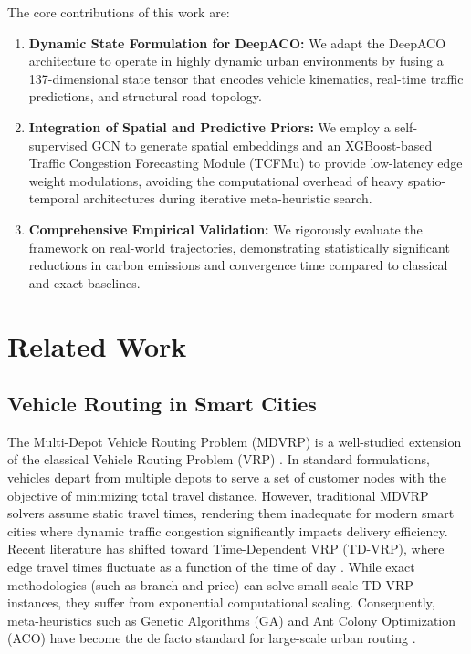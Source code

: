 \documentclass[conference]{IEEEtran}
\begin{document}
The core contributions of this work are:
\begin{enumerate}
    \item \textbf{Dynamic State Formulation for DeepACO:} We adapt the DeepACO architecture to operate in highly dynamic urban environments by fusing a 137-dimensional state tensor that encodes vehicle kinematics, real-time traffic predictions, and structural road topology.
    \item \textbf{Integration of Spatial and Predictive Priors:} We employ a self-supervised GCN to generate spatial embeddings and an XGBoost-based Traffic Congestion Forecasting Module (TCFMu) to provide low-latency edge weight modulations, avoiding the computational overhead of heavy spatio-temporal architectures \cite{stgcn_traffic} during iterative meta-heuristic search.
    \item \textbf{Comprehensive Empirical Validation:} We rigorously evaluate the framework on real-world trajectories, demonstrating statistically significant reductions in carbon emissions and convergence time compared to classical and exact baselines.
\end{enumerate}

\section{Related Work}
\label{sec:related_work}

\subsection{Vehicle Routing in Smart Cities}
The Multi-Depot Vehicle Routing Problem (MDVRP) is a well-studied extension of the classical Vehicle Routing Problem (VRP) \cite{vrp_survey}. In standard formulations, vehicles depart from multiple depots to serve a set of customer nodes with the objective of minimizing total travel distance. However, traditional MDVRP solvers assume static travel times, rendering them inadequate for modern smart cities where dynamic traffic congestion significantly impacts delivery efficiency. Recent literature has shifted toward Time-Dependent VRP (TD-VRP), where edge travel times fluctuate as a function of the time of day \cite{tdvrp_ref}. While exact methodologies (such as branch-and-price) can solve small-scale TD-VRP instances, they suffer from exponential computational scaling. Consequently, meta-heuristics such as Genetic Algorithms (GA) and Ant Colony Optimization (ACO) have become the de facto standard for large-scale urban routing \cite{metaheuristic_survey}.
\end{document}
